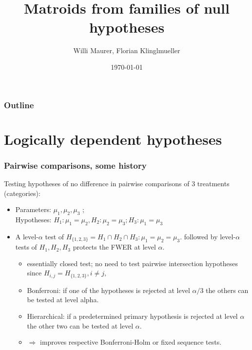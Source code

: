 \documentclass[bigger]{beamer}
\title{Matroids from families of null hypotheses}
\author{Willi Maurer, Florian Klinglmueller}
\date{\today}
\begin{document}
\maketitle



\begin{frame}
\frametitle{Outline}
\setcounter{tocdepth}{3}
\tableofcontents
\end{frame}




\section{Logically dependent hypotheses}


\begin{frame}
\frametitle{Pairwise comparisons, some history }

Testing hypotheses of no difference in pairwise comparisons of 3 treatments (categories):
\begin{itemize}
  \item Parameters: $\mu_1,\mu_2,\mu_3$ ; \\ Hypotheses: $H_1:\mu_1=\mu_2,H_2:\mu_2=\mu_3;H_3:\mu_1=\mu_3$
  \item A level-$\alpha$ test of $H_ {\{1,2,3\}} = H_1\cap H_2 \cap H_3 : \mu_1=\mu_2=\mu_3$. followed by level-$\alpha$ tests of $H_1,H_2,H_3$ protects the FWER at level $\alpha$.
  \begin{itemize}
    \item  essentially closed test; no need to test pairwise intersection hypotheses since $H_{{i,j}} = H_{\{1,2,3\}}, i\neq j$,
    \item  Bonferroni: if one of the hypotheses is rejected at level $\alpha/3$ the others can be tested at level alpha.
    \item  Hierarchical: if a predetermined primary hypothesis is rejected at level $\alpha$ the other two can be tested at level $\alpha$.
    \item  $\Rightarrow$ improves respective Bonferroni-Holm or fixed sequence tests.
  \end{itemize}
\end{itemize}
\end{frame}
\end{document}
